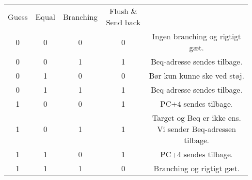 \usepackage[table,x11names]{xcolor}

\begin{table}[!h]
    \hspace{1cm}
    \begin{tabular}{ccc|cc}
    Guess & Equal & Branching & Flush \& Send back & \\ \cline{1-4}
    0 & 0 & 0 & 0 & \color{gray}Ingen branching og rigtigt gæt.\\
    0 & 0 & 1 & 1 & \color{gray}Beq-adresse sendes tilbage.\\
    0 & 1 & 0 & 0 & \color{gray}Bør kun kunne ske ved støj.\\
    0 & 1 & 1 & 1 & \color{gray}Beq-adresse sendes tilbage.\\
    1 & 0 & 0 & 1 & \color{gray}PC+4 sendes tilbage.\\
    1 & 0 & 1 & 1 & \color{gray}Target og Beq er ikke ens. Vi sender Beq-adressen tilbage.\\
    1 & 1 & 0 & 1 & \color{gray}PC+4 sendes tilbage.\\
    1 & 1 & 1 & 0 & \color{gray}Branching og rigtigt gæt.\\
    \end{tabular}
\end{table}
